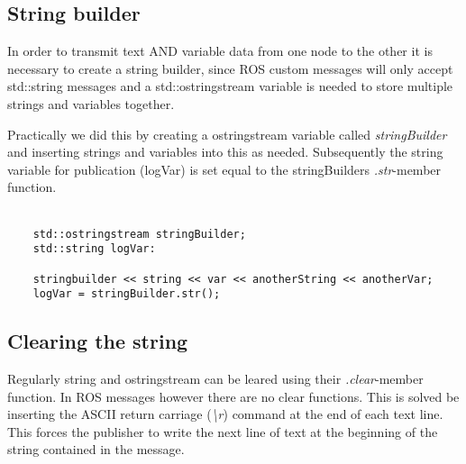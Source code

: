 \subsection{String builder}
In order to transmit text AND variable data from one node to the other it is necessary to create a string builder, since ROS custom messages will only accept std::string messages and a std::ostringstream variable is needed to store multiple strings and variables together.

Practically we did this by creating a ostringstream variable called \textit{stringBuilder} and inserting strings and variables into this as needed. Subsequently the string variable for publication (logVar) is set equal to the stringBuilders \textit{.str}-member function.\\
\\
\begin{lstlisting}
    std::ostringstream stringBuilder;
    std::string logVar:
    
    stringbuilder << string << var << anotherString << anotherVar;
    logVar = stringBuilder.str();
\end{lstlisting}

\subsection{Clearing the string}
Regularly string and ostringstream can be leared using their \textit{.clear}-member function. In ROS messages however there are no clear functions. This is solved be inserting the ASCII return carriage (\textit{\textbackslash r}) command at the end of each text line. This forces the publisher to write the next line of text at the beginning of the string contained in the message.



